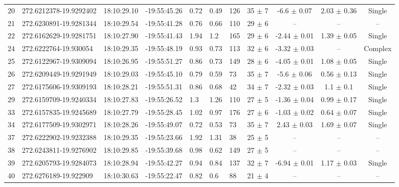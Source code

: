 \documentclass[longauth]{aa} %
\begin{document}
\begin{appendix}
\begin{table}[htbp!]
\begin{tabular}{llllllllccc}
20  &  272.6212378-19.9292402  &  18:10:29.10  &  -19:55:45.26  &  0.72  &  0.49  &  126  &  35 $\pm$ 7  &  -6.6 $\pm$ 0.07  &  2.03 $\pm$ 0.36  &  Single \\
21  &  272.6230891-19.9281344  &  18:10:29.54  &  -19:55:41.28  &  0.76  &  0.66  &  110  &  29 $\pm$ 6  &  --  &  --  &  -- \\
22  &  272.6162629-19.9281751  &  18:10:27.90  &  -19:55:41.43  &  1.94  &  1.2  &  165  &  29 $\pm$ 6  &  -2.44 $\pm$ 0.01  &  1.39 $\pm$ 0.05  &  Single \\
24  &  272.6222764-19.930054  &  18:10:29.35  &  -19:55:48.19  &  0.93  &  0.73  &  113  &  32 $\pm$ 6  &  -3.32 $\pm$ 0.03  &  --  &  Complex \\
25  &  272.6122967-19.9309094  &  18:10:26.95  &  -19:55:51.27  &  0.86  &  0.73  &  149  &  28 $\pm$ 6  &  -4.05 $\pm$ 0.01  &  1.08 $\pm$ 0.05  &  Single \\
26  &  272.6209449-19.9291949  &  18:10:29.03  &  -19:55:45.10  &  0.79  &  0.59  &  73  &  35 $\pm$ 7  &  -5.6 $\pm$ 0.06  &  0.56 $\pm$ 0.13  &  Single \\
27  &  272.6175606-19.9309193  &  18:10:28.21  &  -19:55:51.31  &  0.86  &  0.68  &  42  &  34 $\pm$ 7  &  -2.32 $\pm$ 0.03  &  1.1 $\pm$ 0.1  &  Single \\
29  &  272.6159709-19.9240334  &  18:10:27.83  &  -19:55:26.52  &  1.3  &  1.26  &  110  &  27 $\pm$ 5  &  -1.36 $\pm$ 0.04  &  0.99 $\pm$ 0.17  &  Single \\
33  &  272.6157835-19.9245689  &  18:10:27.79  &  -19:55:28.45  &  1.02  &  0.97  &  176  &  27 $\pm$ 6  &  -1.03 $\pm$ 0.02  &  0.64 $\pm$ 0.07  &  Single \\
34  &  272.6177509-19.9302971  &  18:10:28.26  &  -19:55:49.07  &  0.72  &  0.53  &  73  &  35 $\pm$ 7  &  2.43 $\pm$ 0.03  &  1.69 $\pm$ 0.07  &  Single \\
37  &  272.6222902-19.9232388  &  18:10:29.35  &  -19:55:23.66  &  1.92  &  1.31  &  38  &  25 $\pm$ 5  &  --  &  --  &  -- \\
38  &  272.6243811-19.9276902  &  18:10:29.85  &  -19:55:39.68  &  0.98  &  0.62  &  149  &  27 $\pm$ 5  &  --  &  --  &  -- \\
39  &  272.6205793-19.9284073  &  18:10:28.94  &  -19:55:42.27  &  0.94  &  0.84  &  137  &  32 $\pm$ 7  &  -6.94 $\pm$ 0.01  &  1.17 $\pm$ 0.03  &  Single \\
40  &  272.6276189-19.922909  &  18:10:30.63  &  -19:55:22.47  &  0.82  &  0.6  &  88  &  21 $\pm$ 4  &  --  &  --  &  -- \\

\end{tabular}
\end{table}
\end{appendix}
\end{document}
